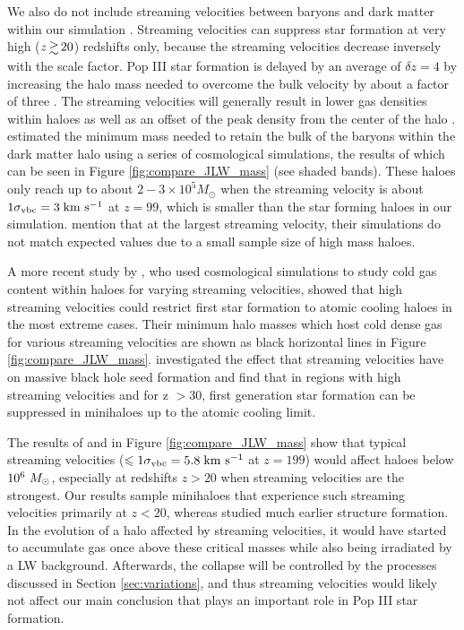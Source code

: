\documentclass[fleqn,usenatbib]{mnras}
\begin{document}
We also do not include streaming velocities between baryons and dark matter within our simulation \citep{Tselia11, Greif11_Delay, Naoz12, OLeary12, Schauer19, Hirano17_Science}. Streaming velocities can suppress star formation at very high ($z \ga 20$) redshifts only, because the streaming velocities decrease inversely with the scale factor. Pop III star formation is delayed by an average of $\delta z = 4$ by increasing the halo mass needed to overcome the bulk velocity by about a factor of three \citep{Greif11_Delay}. The streaming velocities will generally result in lower gas densities within haloes as well as an offset of the peak density from the center of the halo \citep{OLeary12}. \citet{Naoz13} estimated the minimum mass needed to retain the bulk of the baryons within the dark matter halo using a series of cosmological simulations, the results of which can be seen in Figure \ref{fig:compare_JLW_mass} (see shaded bands). These haloes only reach up to about $2 - 3 \times 10^5 M_\odot$ when the streaming velocity is about $1\sigma_{\rm vbc} = 3 \kms$ at $z=99$, which is smaller than the star forming haloes in our simulation. \citet{Naoz13} mention that at the largest streaming velocity, their simulations do not match expected values due to a small sample size of high mass haloes. 

A more recent study by \citet{Schauer19}, who used cosmological simulations to study cold gas content within haloes for varying streaming velocities, showed that high streaming velocities could restrict first star formation to atomic cooling haloes in the most extreme cases. Their minimum halo masses which host cold dense gas for various streaming velocities are shown as black horizontal lines in Figure \ref{fig:compare_JLW_mass}. \citet{Hirano17_Science} investigated the effect that streaming velocities have on massive black hole seed formation and find that in regions with high streaming velocities and for z $> 30$, first generation star formation can be suppressed in minihaloes up to the atomic cooling limit.

The results of \citet{Naoz13} and \citep{Schauer19} in Figure \ref{fig:compare_JLW_mass} show that typical streaming velocities ($\le 1\sigma_{\rm vbc} = 5.8\kms$ at $z=199$) would affect haloes below $10^6~\Ms$, especially at redshifts $z>20$ when streaming velocities are the strongest.  Our results sample minihaloes that experience such streaming velocities primarily at $z < 20$, whereas \citet{Hirano17_Science} studied much earlier structure formation. In the evolution of a halo affected by streaming velocities, it would have started to accumulate gas once above these critical masses while also being irradiated by a LW background.  Afterwards, the collapse will be controlled by the processes discussed in Section \ref{sec:variations}, and thus streaming velocities would likely not affect our main conclusion that \hh{} plays an important role in Pop III star formation.
\end{document}

